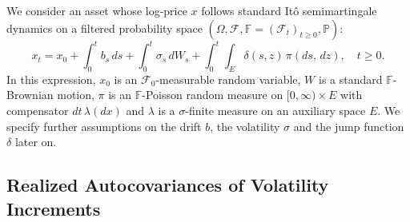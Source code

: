 \documentclass[ecta,nameyear,draft]{econsocart}
\def\wt{\widetilde}
\newcommand{\1}{\mathbf 1}
\newcommand{\calF}{\mathcal{F}}
\newcommand{\jump}{\delta}
\numberwithin{equation}{section}
\begin{document}
We consider an asset whose log-price $x$ follows standard It\^o semimartingale dynamics on a filtered probability space $(\Omega,\calF,\mathbb{F}=(\mathcal{F}_t)_{t\geq 0},\mathbb{P})$:
\begin{equation}
\label{eqn.s}
x_{t} = 
	x_0 + \int_0^t b_{s} \, ds +\int_0^t\sigma_{s}\, dW_{s}
+ 
\int_0^t \int_E \jump(s,z) \, \pi(ds, \, dz),\quad t\geq0.
\end{equation}
In this expression, $x_0$ is an $\mathcal{F}_0$-measurable random variable, $W$ is a standard $\mathbb{F}$-Brownian motion, $\pi$ is an $\mathbb{F}$-Poisson random measure on $[0,\infty) \times E$ with compensator $dt \, \lambda(dx)$ and $\lambda$ is a
$\sigma$-finite measure on an auxiliary space $E$. 
We   specify further assumptions on the drift $b$, the volatility $\sigma$ and the jump function $\jump$ later on. 




\subsection{Realized Autocovariances of  Volatility Increments}\label{sec:LLN}
\end{document}
